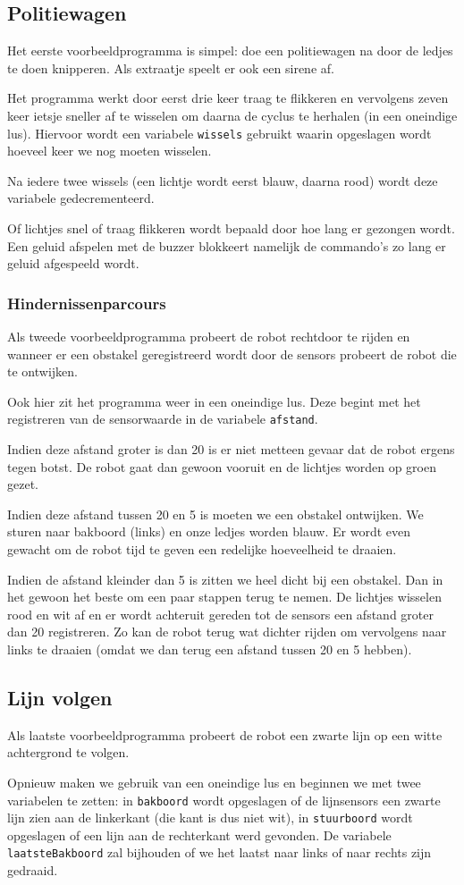 \documentclass[11pt]{article}
\begin{document}
\subsection{Politiewagen}
Het eerste voorbeeldprogramma is simpel: doe een politiewagen na door de ledjes te doen knipperen. Als extraatje speelt er ook een sirene af.

Het programma werkt door eerst drie keer traag te flikkeren en vervolgens zeven keer ietsje sneller af te wisselen om daarna de cyclus te herhalen (in een oneindige lus).
Hiervoor wordt een variabele \texttt{wissels} gebruikt waarin opgeslagen wordt hoeveel keer we nog moeten wisselen.

Na iedere twee wissels (een lichtje wordt eerst blauw, daarna rood) wordt deze variabele gedecrementeerd.

Of lichtjes snel of traag flikkeren wordt bepaald door hoe lang er gezongen wordt. Een geluid afspelen met de buzzer blokkeert namelijk de commando's zo lang er geluid afgespeeld wordt.
\subsubsection{Hindernissenparcours}
Als tweede voorbeeldprogramma probeert de robot rechtdoor te rijden en wanneer er een obstakel geregistreerd wordt door de sensors probeert de robot die te ontwijken.

Ook hier zit het programma weer in een oneindige lus. Deze begint met het registreren van de sensorwaarde in de variabele \texttt{afstand}.

Indien deze afstand groter is dan 20 is er niet metteen gevaar dat de robot ergens tegen botst. De robot gaat dan gewoon vooruit en de lichtjes worden op groen gezet.

Indien deze afstand tussen 20 en 5 is moeten we een obstakel ontwijken. We sturen naar bakboord (links) en onze ledjes worden blauw. Er wordt even gewacht om de robot tijd te geven een redelijke hoeveelheid te draaien.

Indien de afstand kleinder dan 5 is zitten we heel dicht bij een obstakel. Dan in het gewoon het beste om een paar stappen terug te nemen. De lichtjes wisselen rood en wit af en er wordt achteruit gereden tot de sensors een afstand groter dan 20 registreren. Zo kan de robot terug wat dichter rijden om vervolgens naar links te draaien (omdat we dan terug een afstand tussen 20 en 5 hebben).

\subsection{Lijn volgen}
Als laatste voorbeeldprogramma probeert de robot een zwarte lijn op een witte achtergrond te volgen.

Opnieuw maken we gebruik van een oneindige lus en beginnen we met twee variabelen te zetten: in \texttt{bakboord} wordt opgeslagen of de lijnsensors een zwarte lijn zien aan de linkerkant (die kant is dus niet wit), in \texttt{stuurboord} wordt opgeslagen of een lijn aan de rechterkant werd gevonden. De variabele \texttt{laatsteBakboord} zal bijhouden of we het laatst naar links of naar rechts zijn gedraaid.
\end{document}
